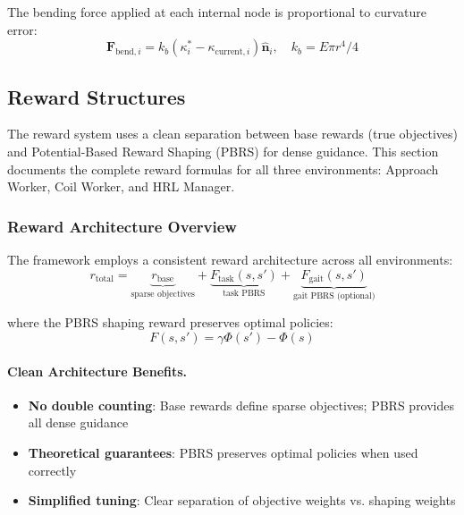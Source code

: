 \documentclass[11pt]{article}
\begin{document}
The bending force applied at each internal node is proportional to curvature error:
\begin{equation}
    \mathbf{F}_{\text{bend}, i} = k_b \left(\kappa^{*}_i - \kappa_{\text{current}, i}\right) \hat{\mathbf{n}}_i,
    \quad k_b = E \pi r^4 / 4
\end{equation}

\subsection{Reward Structures}

The reward system uses a clean separation between base rewards (true objectives) and Potential-Based Reward Shaping (PBRS) for dense guidance. This section documents the complete reward formulas for all three environments: Approach Worker, Coil Worker, and HRL Manager.

\subsubsection{Reward Architecture Overview}

The framework employs a consistent reward architecture across all environments:
\begin{equation}
    r_{\text{total}} = \underbrace{r_{\text{base}}}_{\text{sparse objectives}} + \underbrace{F_{\text{task}}(s, s')}_{\text{task PBRS}} + \underbrace{F_{\text{gait}}(s, s')}_{\text{gait PBRS (optional)}}
\end{equation}

where the PBRS shaping reward preserves optimal policies:
\begin{equation}
    F(s, s') = \gamma \Phi(s') - \Phi(s)
\end{equation}

\paragraph{Clean Architecture Benefits.}
\begin{itemize}
    \item \textbf{No double counting}: Base rewards define sparse objectives; PBRS provides all dense guidance
    \item \textbf{Theoretical guarantees}: PBRS preserves optimal policies when used correctly
    \item \textbf{Simplified tuning}: Clear separation of objective weights vs. shaping weights
\end{itemize}
\end{document}
